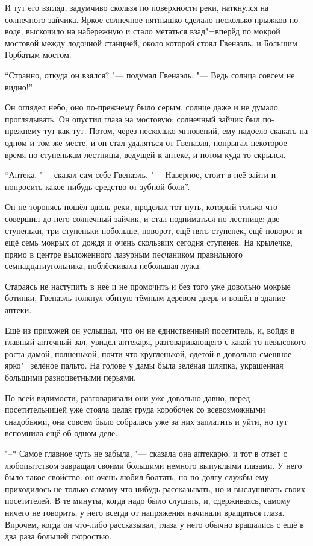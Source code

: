 И тут его взгляд, задумчиво скользя по поверхности реки, наткнулся на
солнечного зайчика.
Яркое солнечное пятнышко сделало несколько прыжков по воде, выскочило на
набережную и стало метаться взад"=вперёд по мокрой мостовой между лодочной
станцией, около которой стоял Гвенаэль, и Большим Горбатым мостом.

\enquote{Странно, откуда он взялся? "--- подумал Гвенаэль.
"--- Ведь солнца совсем не видно!}

Он оглядел небо, оно по-прежнему было серым, солнце даже и не думало
проглядывать.
Он опустил глаза на мостовую: солнечный зайчик был по-прежнему тут как тут.
Потом, через несколько мгновений, ему надоело скакать на одном и том же месте,
и он стал удаляться от Гвенаэля, попрыгал некоторое время по ступенькам
лестницы, ведущей к аптеке, и потом куда-то скрылся.

\enquote{Аптека, "--- сказал сам себе Гвенаэль.
"--- Наверное, стоит в неё зайти и попросить какое-нибудь средство от зубной
боли}.

Он не торопясь пошёл вдоль реки, проделал тот путь, который только что совершил
до него солнечный зайчик, и стал подниматься по лестнице: две ступеньки, три
ступеньки побольше, поворот, ещё пять ступенек, ещё поворот и ещё семь мокрых
от дождя и очень скользких сегодня ступенек.
На крылечке, прямо в центре выложенного лазурным песчаником правильного
семнадцатиугольника, поблёскивала небольшая лужа.

Стараясь не наступить в неё и не промочить и без того уже довольно мокрые
ботинки, Гвенаэль толкнул обитую тёмным деревом дверь и вошёл в здание аптеки.

Ещё из прихожей он услышал, что он не единственный посетитель, и, войдя в
главный аптечный зал, увидел аптекаря, разговаривающего с какой-то невысокого
роста дамой, полненькой, почти что кругленькой, одетой в довольно смешное
ярко"=зелёное пальто.
На голове у дамы была зелёная шляпка, украшенная большими разноцветными перьями.

По всей видимости, разговаривали они уже довольно давно, перед посетительницей
уже стояла целая груда коробочек со всевозможными снадобьями, она совсем было
собралась уже за них заплатить и уйти, но тут вспомнила ещё об одном деле.

"--* Самое главное чуть не забыла, "--- сказала она аптекарю, и тот в ответ с
любопытством завращал своими большими немного выпуклыми глазами.
У него было такое свойство: он очень любил болтать, но по долгу службы ему
приходилось не только самому что-нибудь рассказывать, но и выслушивать своих
посетителей.
В те минуты, когда надо было слушать, и, сдерживаясь, самому ничего не
говорить, у него всегда от напряжения начинали вращаться глаза.
Впрочем, когда он что-либо рассказывал, глаза у него обычно вращались с ещё в
два раза большей скоростью.

